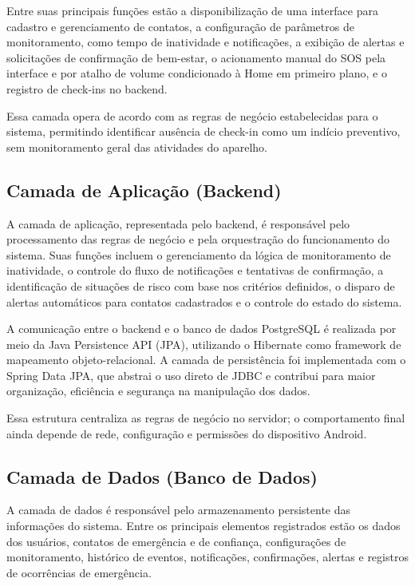 Entre suas principais funções estão a disponibilização de uma interface para cadastro e gerenciamento de contatos, a configuração de parâmetros de monitoramento, como tempo de inatividade e notificações, a exibição de alertas e solicitações de confirmação de bem-estar, o acionamento manual do SOS pela interface e por atalho de volume condicionado à Home em primeiro plano, e o registro de check-ins no backend.

Essa camada opera de acordo com as regras de negócio estabelecidas para o sistema, permitindo identificar ausência de check-in como um indício preventivo, sem monitoramento geral das atividades do aparelho.

\subsection{Camada de Aplicação (Backend)}

A camada de aplicação, representada pelo backend, é responsável pelo processamento das regras de negócio e pela orquestração do funcionamento do sistema. Suas funções incluem o gerenciamento da lógica de monitoramento de inatividade, o controle do fluxo de notificações e tentativas de confirmação, a identificação de situações de risco com base nos critérios definidos, o disparo de alertas automáticos para contatos cadastrados e o controle do estado do sistema.

A comunicação entre o backend e o banco de dados PostgreSQL é realizada por meio da Java Persistence API (JPA), utilizando o Hibernate como framework de mapeamento objeto-relacional. A camada de persistência foi implementada com o Spring Data JPA, que abstrai o uso direto de JDBC e contribui para maior organização, eficiência e segurança na manipulação dos dados.

Essa estrutura centraliza as regras de negócio no servidor; o comportamento final ainda depende de rede, configuração e permissões do dispositivo Android.

\subsection{Camada de Dados (Banco de Dados)}

A camada de dados é responsável pelo armazenamento persistente das informações do sistema. Entre os principais elementos registrados estão os dados dos usuários, contatos de emergência e de confiança, configurações de monitoramento, histórico de eventos, notificações, confirmações, alertas e registros de ocorrências de emergência.


